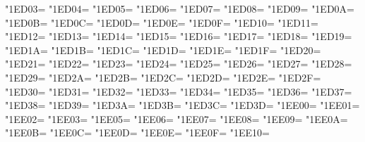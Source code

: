 \XeTeXcharclass"1ED03=\KclassArabU
\XeTeXcharclass"1ED04=\KclassArabU
\XeTeXcharclass"1ED05=\KclassArabU
\XeTeXcharclass"1ED06=\KclassArabU
\XeTeXcharclass"1ED07=\KclassArabU
\XeTeXcharclass"1ED08=\KclassArabU
\XeTeXcharclass"1ED09=\KclassArabU
\XeTeXcharclass"1ED0A=\KclassArabU
\XeTeXcharclass"1ED0B=\KclassArabU
\XeTeXcharclass"1ED0C=\KclassArabU
\XeTeXcharclass"1ED0D=\KclassArabU
\XeTeXcharclass"1ED0E=\KclassArabU
\XeTeXcharclass"1ED0F=\KclassArabU
\XeTeXcharclass"1ED10=\KclassArabU
\XeTeXcharclass"1ED11=\KclassArabU
\XeTeXcharclass"1ED12=\KclassArabU
\XeTeXcharclass"1ED13=\KclassArabU
\XeTeXcharclass"1ED14=\KclassArabU
\XeTeXcharclass"1ED15=\KclassArabU
\XeTeXcharclass"1ED16=\KclassArabU
\XeTeXcharclass"1ED17=\KclassArabU
\XeTeXcharclass"1ED18=\KclassArabU
\XeTeXcharclass"1ED19=\KclassArabU
\XeTeXcharclass"1ED1A=\KclassArabU
\XeTeXcharclass"1ED1B=\KclassArabU
\XeTeXcharclass"1ED1C=\KclassArabU
\XeTeXcharclass"1ED1D=\KclassArabU
\XeTeXcharclass"1ED1E=\KclassArabU
\XeTeXcharclass"1ED1F=\KclassArabU
\XeTeXcharclass"1ED20=\KclassArabU
\XeTeXcharclass"1ED21=\KclassArabU
\XeTeXcharclass"1ED22=\KclassArabU
\XeTeXcharclass"1ED23=\KclassArabU
\XeTeXcharclass"1ED24=\KclassArabU
\XeTeXcharclass"1ED25=\KclassArabU
\XeTeXcharclass"1ED26=\KclassArabU
\XeTeXcharclass"1ED27=\KclassArabU
\XeTeXcharclass"1ED28=\KclassArabU
\XeTeXcharclass"1ED29=\KclassArabU
\XeTeXcharclass"1ED2A=\KclassArabU
\XeTeXcharclass"1ED2B=\KclassArabU
\XeTeXcharclass"1ED2C=\KclassArabU
\XeTeXcharclass"1ED2D=\KclassArabU
\XeTeXcharclass"1ED2E=\KclassArabU
\XeTeXcharclass"1ED2F=\KclassArabU
\XeTeXcharclass"1ED30=\KclassArabU
\XeTeXcharclass"1ED31=\KclassArabU
\XeTeXcharclass"1ED32=\KclassArabU
\XeTeXcharclass"1ED33=\KclassArabU
\XeTeXcharclass"1ED34=\KclassArabU
\XeTeXcharclass"1ED35=\KclassArabU
\XeTeXcharclass"1ED36=\KclassArabU
\XeTeXcharclass"1ED37=\KclassArabU
\XeTeXcharclass"1ED38=\KclassArabU
\XeTeXcharclass"1ED39=\KclassArabU
\XeTeXcharclass"1ED3A=\KclassArabU
\XeTeXcharclass"1ED3B=\KclassArabU
\XeTeXcharclass"1ED3C=\KclassArabU
\XeTeXcharclass"1ED3D=\KclassArabU
\XeTeXcharclass"1EE00=\KclassArabU
\XeTeXcharclass"1EE01=\KclassArabU
\XeTeXcharclass"1EE02=\KclassArabU
\XeTeXcharclass"1EE03=\KclassArabU
\XeTeXcharclass"1EE05=\KclassArabU
\XeTeXcharclass"1EE06=\KclassArabU
\XeTeXcharclass"1EE07=\KclassArabU
\XeTeXcharclass"1EE08=\KclassArabU
\XeTeXcharclass"1EE09=\KclassArabU
\XeTeXcharclass"1EE0A=\KclassArabU
\XeTeXcharclass"1EE0B=\KclassArabU
\XeTeXcharclass"1EE0C=\KclassArabU
\XeTeXcharclass"1EE0D=\KclassArabU
\XeTeXcharclass"1EE0E=\KclassArabU
\XeTeXcharclass"1EE0F=\KclassArabU
\XeTeXcharclass"1EE10=\KclassArabU
